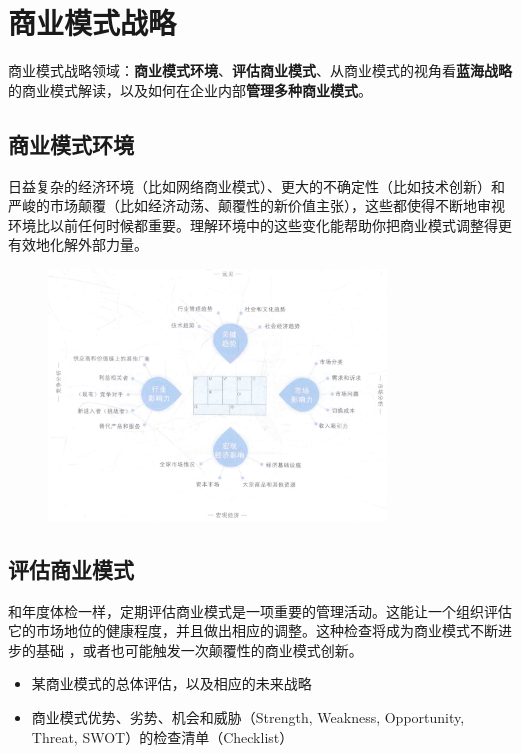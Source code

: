 \section{商业模式战略}

商业模式战略领域：\textbf{商业模式环境}、\textbf{评估商业模式}、从商业模式的视角看\textbf{蓝海战略}的商业模式解读，以及如何在企业内部\textbf{管理多种商业模式}。

\subsection{商业模式环境}

日益复杂的经济环境（比如网络商业模式）、更大的不确定性（比如技术创新）和严峻的市场颠覆（比如经济动荡、颠覆性的新价值主张），这些都使得不断地审视环境比以前任何时候都重要。理解环境中的这些变化能帮助你把商业模式调整得更有效地化解外部力量。

\begin{figure}[H]
	\centering
	\vspace{-0.5em}
	\includegraphics[width=0.8\textwidth]{img/商业模式环境评估.png}
    \vspace{-0.5em}
\end{figure}

\subsection{评估商业模式}

和年度体检一样，定期评估商业模式是一项重要的管理活动。这能让一个组织评估它的市场地位的健康程度，并且做出相应的调整。这种检查将成为商业模式不断进步的基础 ，或者也可能触发一次颠覆性的商业模式创新。
\begin{itemize}
    \item 某商业模式的总体评估，以及相应的未来战略
    \item 商业模式优势、劣势、机会和威胁（Strength, Weakness, Opportunity, Threat, SWOT）的检查清单（Checklist）
\end{itemize}

